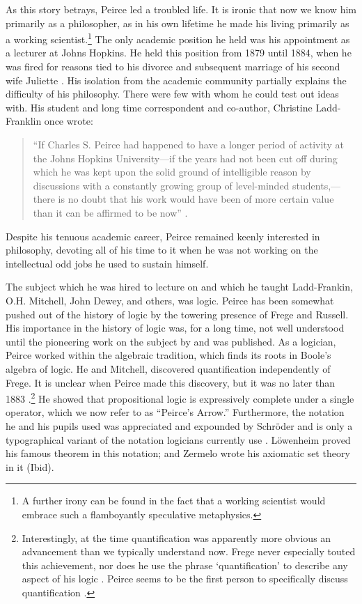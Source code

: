 As this story betrays, Peirce led a troubled life. It is ironic that now we know him primarily as a philosopher, as in his own lifetime he made his living primarily as a working scientist.\footnote{A further irony can be found in the fact that a working scientist would embrace such a flamboyantly speculative metaphysics.} The only academic position he held was his appointment as a lecturer at Johns Hopkins. He held this position from 1879 until 1884, when he was fired for reasons tied to his divorce and subsequent marriage of his second wife Juliette \citep{hoopes_review_1999}. His isolation from the academic community partially explains the difficulty of his philosophy. There were few with whom he could test out ideas with. His student and long time correspondent and co-author, Christine Ladd-Franklin once wrote: \begin{quotation}\noindent``If Charles S. Peirce had happened to have a longer period of activity at the Johns Hopkins University---if the years had not been cut off during which he was kept upon the solid ground of intelligible reason by discussions with a constantly growing group of level-minded students,---there is no doubt that his work would have been of more certain value than it can be affirmed to be now'' \citep{ladd-franklin_charles_1916}.\end{quotation} Despite his tenuous academic career, Peirce remained keenly interested in philosophy, devoting all of his time to it when he was not working on the intellectual odd jobs he used to sustain himself.

The subject which he was hired to lecture on and which he taught Ladd-Frankin, O.H. Mitchell, John Dewey, and others, was logic. Peirce has been somewhat pushed out of the history of logic by the towering presence of Frege and Russell. His importance in the history of logic was, for a long time, not well understood until the  pioneering work on the subject by \citet{Dipert1995-DIPPUP} and \citet{hintikka_place_1997}  was published. As a logician, Peirce worked within the algebraic tradition, which finds its roots in Boole's algebra of logic. He and Mitchell, discovered quantification independently of Frege. It is unclear when Peirce made this discovery, but it was no later than 1883 \citep{mitchell_new_1883}.\footnote{Interestingly, at the time quantification was apparently more obvious an advancement than we typically understand now. Frege never especially touted this achievement, nor does he use the phrase `quantification' to describe any aspect of his logic \citep{Dipert1995-DIPPUP}. Peirce seems to be the first person to specifically discuss quantification \citep{putnam_peirce_1982}.} He showed that propositional logic is expressively complete under a single operator, which we now refer to as ``Peirce's Arrow.'' Furthermore, the notation he and his pupils used was appreciated and expounded by Schröder and is only a typographical variant of the notation logicians currently use \citep{putnam_peirce_1982}. Löwenheim proved his famous theorem in this notation; and Zermelo wrote his axiomatic set theory in it (Ibid).

